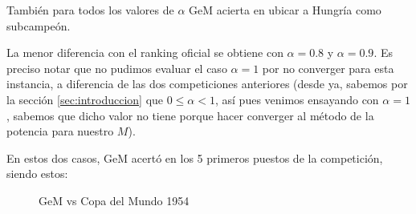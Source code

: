 \begin{enumerate}[parsep=1ex]
        \par También para todos los valores de $\alpha$ GeM acierta en ubicar a
        Hungría como subcampeón.

        \par La menor diferencia con el ranking oficial se obtiene con
        $\alpha=0.8$ y $\alpha=0.9$. Es preciso notar que no pudimos evaluar el
        caso $\alpha=1$ por no converger para esta instancia, a diferencia de
        las dos competiciones anteriores (desde ya, sabemos por la secci\'on
        \ref{sec:introduccion} que $0\leq\alpha <1$, as\'i pues venimos
        ensayando con $\alpha=1$, sabemos que dicho valor no tiene porque hacer
        converger al m\'etodo de la potencia para nuestro $M$).

        \par En estos dos casos, GeM acertó en los 5 primeros puestos de la
        competición, siendo estos:

        \begin{figure}[H]
            \centering
            \caption{GeM vs Copa del Mundo 1954}
            \hspace{10pt}
        \end{figure}
\end{enumerate}
\medskip

